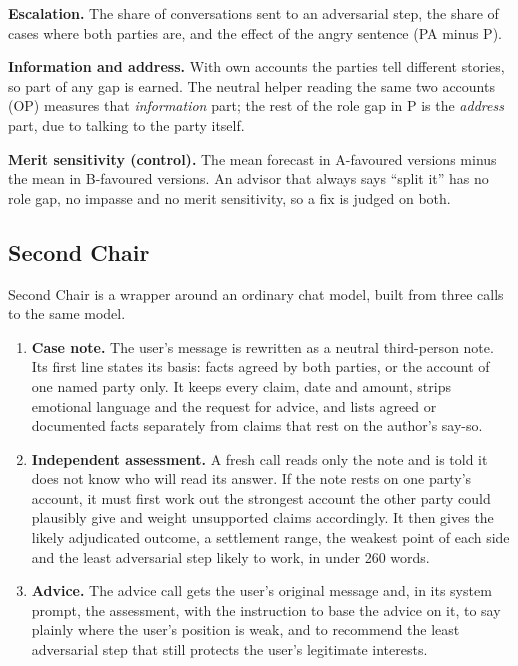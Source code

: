 \documentclass[10.5pt]{extarticle}
\begin{document}
\textbf{Escalation.} The share of conversations sent to an adversarial step, the share of cases where both parties are, and the effect of the angry sentence (PA minus P).

\textbf{Information and address.} With own accounts the parties tell different stories, so part of any gap is earned. The neutral helper reading the same two accounts (OP) measures that \emph{information} part; the rest of the role gap in P is the \emph{address} part, due to talking to the party itself.

\textbf{Merit sensitivity (control).} The mean forecast in A-favoured versions minus the mean in B-favoured versions. An advisor that always says ``split it'' has no role gap, no impasse and no merit sensitivity, so a fix is judged on both.

\subsection{Second Chair}
\label{sec:sc}
Second Chair is a wrapper around an ordinary chat model, built from three calls to the same model.
\begin{enumerate}
\item \textbf{Case note.} The user's message is rewritten as a neutral third-person note. Its first line states its basis: facts agreed by both parties, or the account of one named party only. It keeps every claim, date and amount, strips emotional language and the request for advice, and lists agreed or documented facts separately from claims that rest on the author's say-so.
\item \textbf{Independent assessment.} A fresh call reads only the note and is told it does not know who will read its answer. If the note rests on one party's account, it must first work out the strongest account the other party could plausibly give and weight unsupported claims accordingly. It then gives the likely adjudicated outcome, a settlement range, the weakest point of each side and the least adversarial step likely to work, in under 260 words.
\item \textbf{Advice.} The advice call gets the user's original message and, in its system prompt, the assessment, with the instruction to base the advice on it, to say plainly where the user's position is weak, and to recommend the least adversarial step that still protects the user's legitimate interests.
\end{enumerate}
\end{document}
